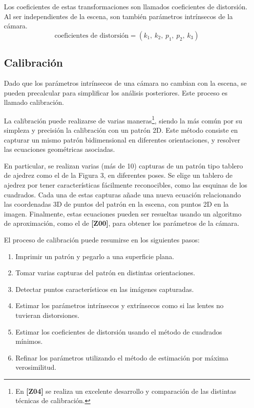 \documentclass[11pt,a4paper,titlepage]{article}
\newcommand{\Cite}[1]{\textbf{[#1]}}
\newcommand{\Figure}[1]{Figura #1}
\begin{document}
Los coeficientes de estas transformaciones son llamados coeficientes de distorsión. Al ser independientes de la escena, son también parámetros intrínsecos de la cámara.
\[
	\textrm{coeficientes\ de\ distorsi\'on} = \left( k_1,\  k_2,\  p_1,\  p_2,\  k_3 \right)
\]

\subsection{Calibración}

Dado que los parámetros intrínsecos de una cámara no cambian con la escena, se pueden precalcular para simplificar los análisis posteriores. Este proceso es llamado calibración.

La calibración puede realizarse de varias maneras\footnote{En \Cite{Z04} se realiza un excelente desarrollo y comparación de las distintas técnicas de calibración.}, siendo la más común por su simpleza y precisión la calibración con un patrón 2D. Este método consiste en capturar un mismo patrón bidimensional en diferentes orientaciones, y resolver las ecuaciones geométricas asociadas.

En particular, se realizan varias (más de 10) capturas de un patrón tipo tablero de ajedrez como el de la \Figure{3}, en diferentes poses. Se elige un tablero de ajedrez por tener características fácilmente reconocibles, como las esquinas de los cuadrados. Cada una de estas capturas añade una nueva ecuación relacionando las coordenadas 3D de puntos del patrón en la escena, con puntos 2D en la imagen. Finalmente, estas ecuaciones pueden ser resueltas usando un algoritmo de aproximación, como el de \Cite{Z00}, para obtener los parámetros de la cámara.

\noindent
El proceso de calibración puede resumirse en los siguientes pasos:
\begin{enumerate}
	\item Imprimir un patrón y pegarlo a una superficie plana.
	\item Tomar varias capturas del patrón en distintas orientaciones.
	\item Detectar puntos característicos en las imágenes capturadas.
	\item Estimar los parámetros intrínsecos y extrínsecos como si las lentes no tuvieran distorsiones.
	\item Estimar los coeficientes de distorsión usando el método de cuadrados mínimos.
	\item Refinar los parámetros utilizando el método de estimación por máxima verosimilitud.
\end{enumerate}
\end{document}
